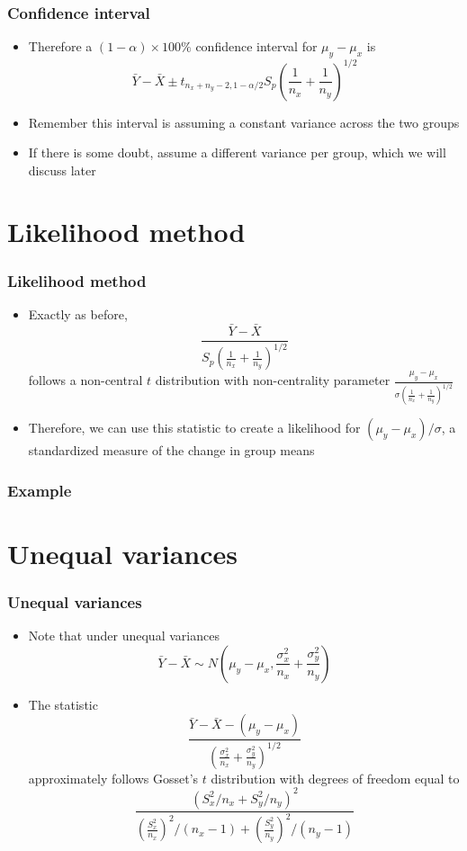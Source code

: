 \documentclass[aspectratio=169]{beamer}
\begin{document}
\begin{frame}\frametitle{Confidence interval}
  \begin{itemize}
  \item Therefore a $(1 - \alpha)\times 100\%$ confidence interval for
    $\mu_y - \mu_x$ is 
    $$
    \bar Y - \bar X \pm t_{n_x + n_y - 2, 1 - \alpha/2}S_p\left(\frac{1}{n_x} + \frac{1}{n_y}\right)^{1/2}
    $$
  \item Remember this interval is assuming a constant variance across the
    two groups
  \item If there is some doubt, assume a different variance per group, which
    we will discuss later
  \end{itemize}
\end{frame}

\section{Likelihood method}
\begin{frame}\frametitle{Likelihood method}
  \begin{itemize}
  \item Exactly as before, 
    $$
    \frac{\bar Y - \bar X}{S_p \left(\frac{1}{n_x} + \frac{1}{n_y}\right)^{1/2}}
    $$
    follows a non-central $t$ distribution with non-centrality parameter
    $\frac{\mu_y - \mu_x}{\sigma  \left(\frac{1}{n_x} + \frac{1}{n_y}\right)^{1/2}}$
  \item Therefore, we can use this statistic to create a likelihood for
    $(\mu_y - \mu_x) / \sigma$, a standardized measure of the change in
    group means
  \end{itemize}
\end{frame}

\begin{frame}\frametitle{Example}
\end{frame}

\section{Unequal variances}
\begin{frame}\frametitle{Unequal variances}
  \begin{itemize}
  \item Note that under unequal variances
    $$
    \bar Y - \bar X \sim N\left(\mu_y - \mu_x, \frac{\sigma_x^2}{n_x} + \frac{\sigma_y^2}{n_y}\right)
    $$
  \item The statistic 
    $$
    \frac{\bar Y - \bar X - (\mu_y - \mu_x)}{\left(\frac{\sigma_x^2}{n_x} + \frac{\sigma_y^2}{n_y}\right)^{1/2}}
    $$
    approximately follows Gosset's $t$ distribution with degrees of freedom equal to
    $$
    \frac{\left(S_x^2 / n_x + S_y^2/n_y\right)^2}
    {\left(\frac{S_x^2}{n_x}\right)^2 / (n_x - 1) +
      \left(\frac{S_y^2}{n_y}\right)^2 / (n_y - 1)}
    $$
  \end{itemize}
\end{frame}
\end{document}
